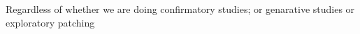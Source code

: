 \documentclass[]{svjour3}
\newcommand{\BLACK}{%
  \endgroup
}
\begin{document}
Regardless of whether we are doing 
confirmatory studies;
or  genarative studies
or exploratory  patching

   \BLACK

 
 
 



\end{document}
